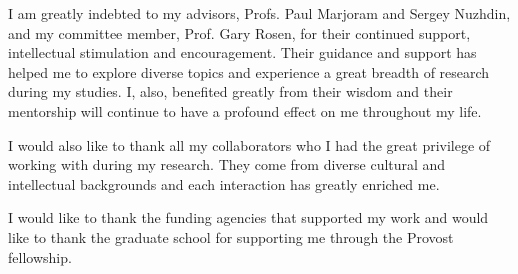 I am greatly indebted to my advisors, Profs. Paul Marjoram and Sergey Nuzhdin, and my committee member, Prof. Gary Rosen, for their continued support, intellectual stimulation and encouragement. Their guidance and support has helped me to explore diverse topics and experience a great breadth of research during my studies. I, also, benefited greatly from their wisdom and their mentorship will continue to have a profound effect on me throughout my life. 

I would also like to thank all my collaborators who I had the great privilege of working with during my research. They come from diverse cultural and intellectual backgrounds and each interaction has greatly enriched me. 

I would like to thank the funding agencies that supported my work and would like to thank the graduate school for supporting me through the Provost fellowship. 